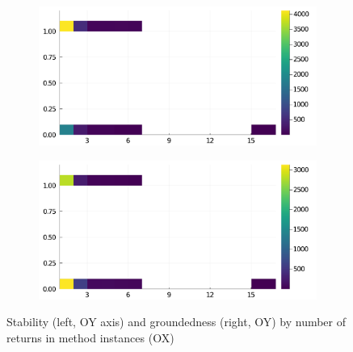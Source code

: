 \begin{figure}[h]
     \begin{subfigure}[b]{0.49\textwidth}
       \includegraphics[width=\textwidth]{figs/all-package-graphs/DifferentialEquations-returns-vs-stable.pdf}
     \end{subfigure}
     \begin{subfigure}[b]{0.49\textwidth}
       \includegraphics[width=\textwidth]{figs/all-package-graphs/DifferentialEquations-returns-vs-grounded.pdf}
     \end{subfigure}
\caption{Stability (left, OY axis) and groundedness (right, OY) by number of returns in method instances (OX)}%
%
\label{figs:returns:DifferentialEquations}
\end{figure}
\clearpage
